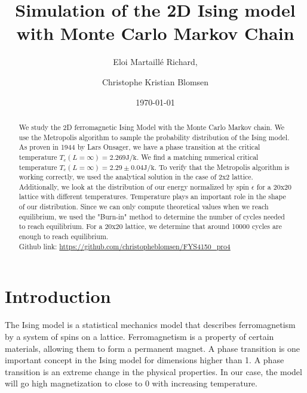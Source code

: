 \documentclass[english,notitlepage,reprint,nofootinbib]{revtex4-2}  %
\begin{document}
	
	\title{Simulation of the 2D Ising model with Monte Carlo Markov Chain}  %
	\author{Eloi Martaillé Richard,
        \and
		Christophe Kristian Blomsen
        }
	\date{\today}                             %
	\noaffiliation                            %
	
	\begin{abstract}
We study the 2D ferromagnetic Ising Model with the Monte Carlo Markov chain. We
use the Metropolis algorithm to sample the probability distribution of the Ising
model.
	As proven in 1944 by Lars Onsager\cite{PhysRev.65.117}, we have a phase
transition at the critical temperature $T_c(L=\infty)=2.269 \mathrm{J / k}$. We
find a matching numerical critical temperature
$T_c(L=\infty) = 2.29 \pm 0.04 \mathrm{J / k}$. To verify that the Metropolis
algorithm is working correctly, we used the analytical solution in the case  of
2x2 lattice. Additionally, we look at the distribution of our energy normalized
by spin $\epsilon$ for a 20x20 lattice with different temperatures. Temperature plays an important role in the shape of our distribution. Since
we can only compute theoretical values when we reach equilibrium, we used the
"Burn-in"  method to determine the number of cycles needed to reach equilibrium.
For a 20x20 lattice, we determine that around 10000 cycles are enough to reach
equilibrium.
\\
\newline
Github link: \href{https://github.com/christopheblomsen/FYS4150_pro4}{https://github.com/christopheblomsen/FYS4150\_pro4}
\end{abstract}
	\maketitle	
	
	
	\section{Introduction} \label{sec:introduction}
	The Ising model is a statistical mechanics model that describes ferromagnetism by a system of spins on a lattice.
	Ferromagnetism is a property of certain materials, allowing them to form a permanent magnet. A phase transition is one important concept in the Ising model for dimensions
	higher than 1. A phase transition is an extreme change in the physical properties. In our case, the model will go high magnetization to close to
	0 with increasing temperature. \\
\end{document}
